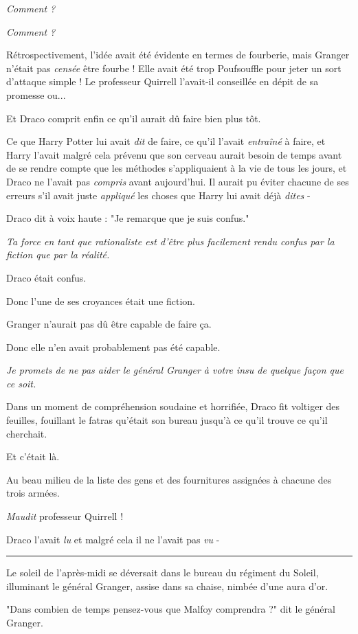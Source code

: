 \emph{Comment ?} 

\emph{Comment ?} 

Rétrospectivement, l'idée avait été évidente en termes de fourberie, mais Granger n'était pas \emph{censée}  être fourbe ! Elle avait été trop Poufsouffle pour jeter un sort d'attaque simple ! Le professeur Quirrell l'avait-il conseillée en dépit de sa promesse ou...

Et Draco comprit enfin ce qu'il aurait dû faire bien plus tôt.

Ce que Harry Potter lui avait \emph{dit}  de faire, ce qu'il l'avait \emph{entraîné}  à faire, et Harry l'avait malgré cela prévenu que son cerveau aurait besoin de temps avant de se rendre compte que les méthodes s'appliquaient à la vie de tous les jours, et Draco ne l'avait pas \emph{compris}  avant aujourd'hui. Il aurait pu éviter chacune de ses erreurs s'il avait juste \emph{appliqué}  les choses que Harry lui avait déjà \emph{dites}  -

Draco dit à voix haute : "Je remarque que je suis confus."

\emph{Ta force en tant que rationaliste est d'être plus facilement rendu confus par la fiction que par la réalité.} 

Draco était confus.

Donc l'une de ses croyances était une fiction.

Granger n'aurait pas dû être capable de faire ça.

Donc elle n'en avait probablement pas été capable.

\emph{Je promets de ne pas aider le général Granger à votre insu de quelque façon que ce soit.} 

Dans un moment de compréhension soudaine et horrifiée, Draco fit voltiger des feuilles, fouillant le fatras qu'était son bureau jusqu'à ce qu'il trouve ce qu'il cherchait.

Et c'était là.

Au beau milieu de la liste des gens et des fournitures assignées à chacune des trois armées.

\emph{Maudit}  professeur Quirrell !

Draco l'avait \emph{lu}  et malgré cela il ne l'avait pas \emph{vu}  -
\par\noindent\rule{\textwidth}{0.4pt}
Le soleil de l'après-midi se déversait dans le bureau du régiment du Soleil, illuminant le général Granger, assise dans sa chaise, nimbée d'une aura d'or.

"Dans combien de temps pensez-vous que Malfoy comprendra ?" dit le général Granger.

